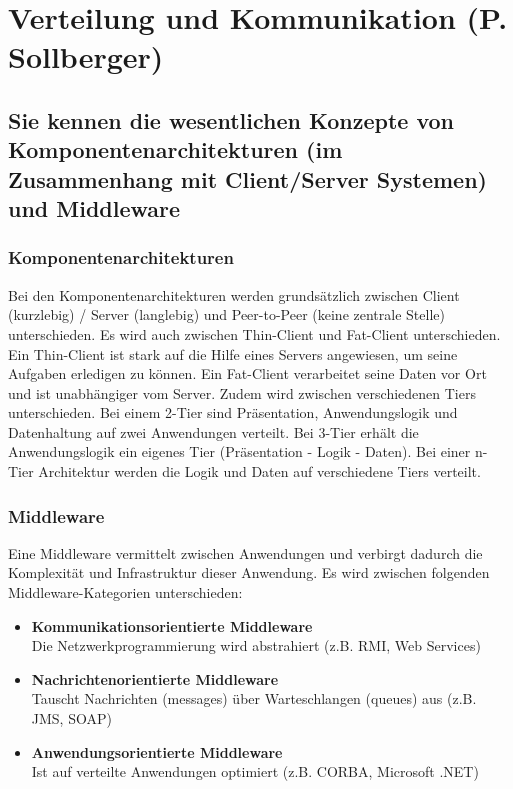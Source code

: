\section{Verteilung und Kommunikation (P. Sollberger)}
\label{sec:sollberger}

\subsection{Sie kennen die wesentlichen Konzepte von Komponentenarchitekturen (im Zusammenhang mit Client/Server Systemen) und Middleware}

\subsubsection{Komponentenarchitekturen}

Bei den Komponentenarchitekturen werden grundsätzlich zwischen Client (kurzlebig) / Server (langlebig) und Peer-to-Peer (keine zentrale Stelle) unterschieden. Es wird auch zwischen Thin-Client und Fat-Client unterschieden. Ein Thin-Client ist stark auf die Hilfe eines Servers angewiesen, um seine Aufgaben erledigen zu können. Ein Fat-Client verarbeitet seine Daten vor Ort und ist unabhängiger vom Server. Zudem wird zwischen verschiedenen Tiers unterschieden. Bei einem 2-Tier sind Präsentation, Anwendungslogik und Datenhaltung auf zwei Anwendungen verteilt. Bei 3-Tier erhält die Anwendungslogik ein eigenes Tier (Präsentation - Logik - Daten). Bei einer n-Tier Architektur werden die Logik und Daten auf verschiedene Tiers verteilt.

\subsubsection{Middleware}

Eine Middleware vermittelt zwischen Anwendungen und verbirgt dadurch die Komplexität und Infrastruktur dieser Anwendung. Es wird zwischen folgenden Middleware-Kategorien unterschieden:

\begin{itemize}
	\item \textbf{Kommunikationsorientierte Middleware} \\
		  Die Netzwerkprogrammierung wird abstrahiert (z.B. RMI, Web Services)
	\item \textbf{Nachrichtenorientierte Middleware} \\
		  Tauscht Nachrichten (messages) über Warteschlangen (queues) aus (z.B. JMS, SOAP)
	\item \textbf{Anwendungsorientierte Middleware} \\
		  Ist auf verteilte Anwendungen optimiert (z.B. CORBA, Microsoft .NET)
\end{itemize} 

